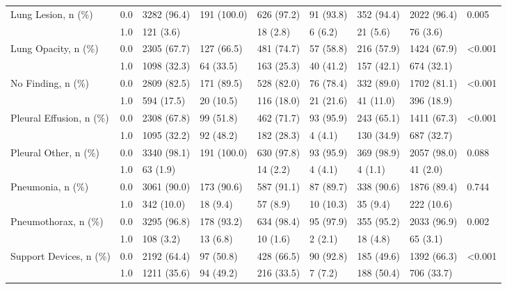 \begin{tabular}{lllllllll}
Lung Lesion, n (\%) & 0.0 &            3282 (96.4) &  191 (100.0) &  626 (97.2) &       91 (93.8) &  352 (94.4) &  2022 (96.4) &   0.005 \\
                       & 1.0 &              121 (3.6) &              &    18 (2.8) &         6 (6.2) &    21 (5.6) &     76 (3.6) &         \\
Lung Opacity, n (\%) & 0.0 &            2305 (67.7) &   127 (66.5) &  481 (74.7) &       57 (58.8) &  216 (57.9) &  1424 (67.9) &  <0.001 \\
                       & 1.0 &            1098 (32.3) &    64 (33.5) &  163 (25.3) &       40 (41.2) &  157 (42.1) &   674 (32.1) &         \\
No Finding, n (\%) & 0.0 &            2809 (82.5) &   171 (89.5) &  528 (82.0) &       76 (78.4) &  332 (89.0) &  1702 (81.1) &  <0.001 \\
                       & 1.0 &             594 (17.5) &    20 (10.5) &  116 (18.0) &       21 (21.6) &   41 (11.0) &   396 (18.9) &         \\
Pleural Effusion, n (\%) & 0.0 &            2308 (67.8) &    99 (51.8) &  462 (71.7) &       93 (95.9) &  243 (65.1) &  1411 (67.3) &  <0.001 \\
                       & 1.0 &            1095 (32.2) &    92 (48.2) &  182 (28.3) &         4 (4.1) &  130 (34.9) &   687 (32.7) &         \\
Pleural Other, n (\%) & 0.0 &            3340 (98.1) &  191 (100.0) &  630 (97.8) &       93 (95.9) &  369 (98.9) &  2057 (98.0) &   0.088 \\
                       & 1.0 &               63 (1.9) &              &    14 (2.2) &         4 (4.1) &     4 (1.1) &     41 (2.0) &         \\
Pneumonia, n (\%) & 0.0 &            3061 (90.0) &   173 (90.6) &  587 (91.1) &       87 (89.7) &  338 (90.6) &  1876 (89.4) &   0.744 \\
                       & 1.0 &             342 (10.0) &     18 (9.4) &    57 (8.9) &       10 (10.3) &    35 (9.4) &   222 (10.6) &         \\
Pneumothorax, n (\%) & 0.0 &            3295 (96.8) &   178 (93.2) &  634 (98.4) &       95 (97.9) &  355 (95.2) &  2033 (96.9) &   0.002 \\
                       & 1.0 &              108 (3.2) &     13 (6.8) &    10 (1.6) &         2 (2.1) &    18 (4.8) &     65 (3.1) &         \\
Support Devices, n (\%) & 0.0 &            2192 (64.4) &    97 (50.8) &  428 (66.5) &       90 (92.8) &  185 (49.6) &  1392 (66.3) &  <0.001 \\
                       & 1.0 &            1211 (35.6) &    94 (49.2) &  216 (33.5) &         7 (7.2) &  188 (50.4) &   706 (33.7) &         \\
\bottomrule
\end{tabular}
